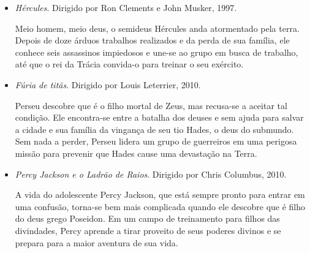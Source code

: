 \documentclass[11pt]{extarticle}
\begin{document}
\begin{itemize}
\item \textit{Hércules}. Dirigido por Ron Clements e John Musker, 1997.

Meio homem, meio deus, o semideus Hércules anda atormentado pela terra. Depois de doze árduos trabalhos realizados e da perda de sua família, ele conhece seis assassinos impiedosos e une-se ao grupo em busca de trabalho, até que o rei da Trácia convida-o para treinar o seu exército.

\item \textit{Fúria de titãs}. Dirigido por Louis Leterrier, 2010.

Perseu descobre que é o filho mortal de Zeus, mas recusa-se a aceitar tal condição. Ele encontra-se entre a batalha dos deuses e sem ajuda para salvar a cidade e sua família da vingança de seu tio Hades, o deus do submundo. Sem nada a perder, Perseu lidera um grupo de guerreiros em uma perigosa missão para prevenir que Hades cause uma devastação na Terra.

\item \textit{Percy Jackson e o Ladrão de Raios}. Dirigido por Chris Columbus, 2010.

A vida do adolescente Percy Jackson, que está sempre pronto para entrar em uma confusão, torna-se bem mais complicada quando ele descobre que é filho do deus grego Poseidon. Em um campo de treinamento para filhos das divindades, Percy aprende a tirar proveito de seus poderes divinos e se prepara para a maior aventura de sua vida.

\end{itemize}
\end{document}
